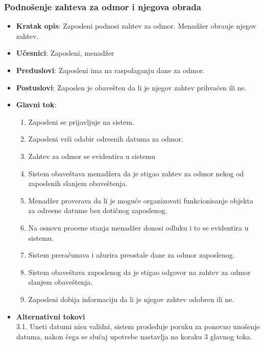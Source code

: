   \subsubsection{Podno\v senje zahteva za odmor i njegova obrada }
 \begin{itemize}
    \item \textbf{Kratak opis}:
   Zaposleni podnosi zahtev za odmor. Menad\v zer obra\dj uje njegov zahtev.
    \item \textbf{Učesnici}:
    Zaposleni, menad\v zer
    \item \textbf{Preduslovi}: Zaposleni ima na raspolaganju dane za odmor.
    \item \textbf{Postuslovi}:
    Zaposlen je obave\v sten da li je njegov zahtev prihva\'cen ili ne.
    \item \textbf{Glavni tok}:
    \begin{enumerate}
        \item Zaposleni se prijavljuje na sistem.
        \item Zaposleni vr\v si odabir odre\dj enih datuma za odmor.
        \item Zahtev za odmor se evidentira u sistemu 
        \item Sistem obave\v stava menad\v zera da je stigao zahtev za odmor nekog od zaposlenih slanjem obaveštenja.
        \item Menad\v zer proverava da li je moguće organizovati funkcionisanje objekta za odre\dj ene datume bez dotičnog zaposlenog.
        \item Na osnovu procene stanja menad\v zer donosi odluku i to se evidentira u sistemu.
        \item Sistem prera\v cunava i a\v zurira preostale dane za odmor zaposlenog.
        \item Sistem obave\v stava zaposlenog da je stigao odgovor na zahtev za odmor slanjem obaveštenja.
        \item Zaposleni dobija informaciju da li je njegov zahtev odobren ili ne.
    \end{enumerate}
\item \textbf{Alternativni tokovi}\\
        3.1. Uneti datumi nisu validni, sistem prosleđuje poruku za ponovno unošenje datuma, nakon čega se slučaj upotrebe nastavlja na koraku 3 glavnog toka.

 \end{itemize}
 
